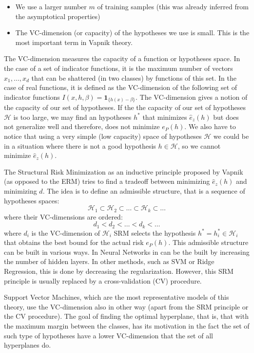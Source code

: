 \begin{itemize}
    \item We use a larger number $m$ of training samples (this was already inferred from the asymptotical properties)
    \item The VC-dimension (or capacity) of the hypotheses we use is small. This is the most important term in Vapnik theory.
\end{itemize}
The VC-dimension measures the capacity of a function or hypotheses space. In the case of a set of indicator functions, it is the maximum number of vectors $x_1, \ldots, x_d$ that can be shattered (in two classes) by functions of this set.
In the case of real functions, it is defined as the VC-dimension of the following set of indicator functions 
$ I(x, h, \beta) = \bm{1}_{\{h(x) - \beta\}} $.
The VC-dimension gives a notion of the capacity of our set of hypotheses. If the the capacity of our set of hypotheses $\mathcal{H}$ is too large, we may find an hypotheses $h^*$ that minimizes $\hat{e}_z(h)$ but does not generalize well and therefore, does not minimize $e_P(h)$. We also have to notice that using a very simple (low capacity) space of hypotheses $\mathcal{H}$ we could be in a situation where there is not a good hypothesis $h \in \mathcal{H}$, so we cannot minimize $\hat{e}_z(h)$.

The Structural Risk Minimization as an inductive principle proposed by Vapnik (as opposed to the ERM) tries to find a tradeoff between minimizing $\hat{e}_z(h)$ and minimizing $d$. The idea is to define an admissible structure, that is a sequence of hypotheses spaces:
$$ \mathcal{H}_1 \subset \mathcal{H}_2 \subset \ldots \subset \mathcal{H}_k \subset \ldots $$ 
where their VC-dimensions are ordered:
$$ d_1 < d_2 < \ldots < d_k < \ldots$$
where $d_i$ is the VC-dimension of $\mathcal{H}_i$
SRM selects the hypothesis $h^* = h_i^* \in \mathcal{H}_i$ that obtains the best bound for the actual risk $e_P(h)$.
This admissible structure can be built in various ways. In Neural Networks in can be the built by increasing the number of hidden layers. In other methods, such as SVM or Ridge Regression, this is done by decreasing the regularization.
However, this SRM principle is usually replaced by a cross-validation (CV) procedure.

Support Vector Machines, which are the most representative models of this theory, use the VC-dimension also in other way (apart from the SRM principle or the CV procedure). The goal of finding the optimal hyperplane, that is, that with the maximum margin between the classes, has its motivation in the fact the set of such type of hypotheses have a lower VC-dimension that the set of all hyperplanes do.


